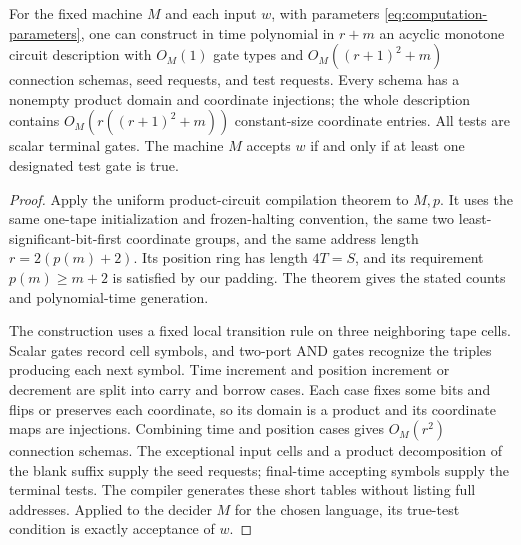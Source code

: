 \begin{proposition}
\label{prop:computation}
For the fixed machine \(M\) and each input \(w\), with parameters
\eqref{eq:computation-parameters}, one can construct in time polynomial in
\(r+m\) an acyclic monotone circuit description with \(O_M(1)\) gate types and
\(O_M((r+1)^2+m)\) connection schemas, seed requests, and test requests.
Every schema has a nonempty product domain and coordinate injections;
the whole description contains \(O_M(r((r+1)^2+m))\) constant-size
coordinate entries. All tests are scalar terminal gates.
The machine \(M\) accepts \(w\) if and only if at least one designated test
gate is true.
\end{proposition}

\begin{proof}
Apply the uniform product-circuit compilation theorem
\cite[Proposition~3.2]{VariableWL} to \(M,p\). It uses the same
one-tape initialization and frozen-halting convention, the same two
least-significant-bit-first coordinate groups, and the same address
length \(r=2(p(m)+2)\). Its position ring has length \(4T=S\),
and its requirement \(p(m)\ge m+2\) is satisfied by our padding.
The theorem gives the stated counts and polynomial-time generation.

The construction uses a fixed local transition rule on three neighboring
tape cells. Scalar gates record cell symbols, and two-port AND gates
recognize the triples producing each next symbol. Time increment and
position increment or decrement are split into carry and borrow cases.
Each case fixes some bits and flips or preserves each coordinate,
so its domain is a product and its coordinate maps are injections.
Combining time and position cases gives \(O_M(r^2)\) connection schemas.
The exceptional input cells and a product decomposition of the blank
suffix supply the seed requests; final-time accepting symbols supply
the terminal tests. The compiler generates these short tables without
listing full addresses. Applied to the decider \(M\) for the chosen
language, its true-test condition is exactly acceptance of \(w\).
\end{proof}
